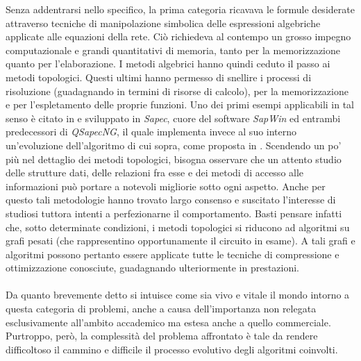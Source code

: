 Senza addentrarsi nello specifico, la prima categoria ricavava le formule desiderate attraverso tecniche di manipolazione simbolica delle espressioni algebriche applicate alle equazioni della rete. Ciò richiedeva al contempo un grosso impegno computazionale e grandi quantitativi di memoria, tanto per la memorizzazione quanto per l'elaborazione. I metodi algebrici hanno quindi ceduto il passo ai metodi topologici. Questi ultimi hanno permesso di snellire i processi di risoluzione (guadagnando in termini di risorse di calcolo), per la memorizzazione e per l'espletamento delle proprie funzioni. Uno dei primi esempi applicabili in tal senso è citato in \cite{Grimbleby} e sviluppato in \textit{Sapec}, cuore del software \textit{SapWin} ed entrambi predecessori di \textit{QSapecNG}, il quale implementa invece al suo interno un'evoluzione dell'algoritmo di cui sopra, come proposta in \cite{MRT}. Scendendo un po' più nel dettaglio dei metodi topologici, bisogna osservare che un attento studio delle strutture dati, delle relazioni fra esse e dei metodi di accesso alle informazioni può portare a notevoli migliorie sotto ogni aspetto. Anche per questo tali metodologie hanno trovato largo consenso e suscitato l'interesse di studiosi tuttora intenti a perfezionarne il comportamento. Basti pensare infatti che, sotto determinate condizioni, i metodi topologici si riducono ad algoritmi su grafi pesati (che rappresentino opportunamente il circuito in esame). A tali grafi e algoritmi possono pertanto essere applicate tutte le tecniche di compressione e ottimizzazione conosciute, guadagnando ulteriormente in prestazioni.

\paragraph{}
Da quanto brevemente detto si intuisce come sia vivo e vitale il mondo intorno a questa categoria di problemi, anche a causa dell'importanza non relegata esclusivamente all'ambito accademico ma estesa anche a quello commerciale. Purtroppo, però, la complessità del problema affrontato è tale da rendere difficoltoso il cammino e difficile il processo evolutivo degli algoritmi coinvolti.


